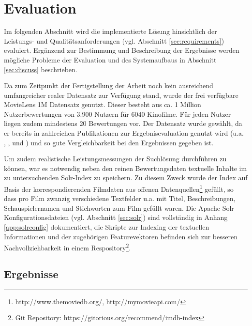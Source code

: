 \newpage \section{Evaluation}\label{sec:evaluation}


Im folgenden Abschnitt wird die implementierte Lösung hinsichtlich der Leistungs- und Qualitätsanforderungen (vgl. Abschnitt \ref{sec:requirements}) evaluiert. Ergänzend zur Bestimmung und Beschreibung der Ergebnisse werden mögliche Probleme der Evaluation und des Systemaufbaus in Abschnitt \ref{sec:discuss} beschrieben.

Da zum Zeitpunkt der Fertigstellung der Arbeit noch kein ausreichend umfangreicher realer Datensatz zur Verfügung stand, wurde der frei verfügbare MovieLens 1M \citep{movielens1m} Datensatz genutzt. Dieser besteht aus ca. 1 Million Nutzerbewertungen von 3.900 Nutzern für 6040 Kinofilme. Für jeden Nutzer liegen zudem mindestens 20 Bewertungen vor. Der Datensatz wurde gewählt, da er bereits in zahlreichen Publikationen zur Ergebnisevaluation genutzt wird  (u.a.  \citep{Cacheda2011}, \citep{Candillier:2008}, \citep{Paterek07} und \citep{Herlocker:1999:AFP:312624.312682}) und so gute Vergleichbarkeit bei den Ergebnissen gegeben ist.

Um zudem realistische Leistungsmessungen der Suchlösung durchführen zu können, war es notwendig neben den reinen Bewertungsdaten textuelle Inhalte im zu untersuchenden Solr-Index zu speichern. Zu diesem Zweck wurde der Index auf Basis der korrespondierenden Filmdaten aus offenen Datenquellen\footnote{http://www.themoviedb.org/, http://mymovieapi.com/} gefüllt, so dass pro Film zwanzig verschiedene Textfelder u.a. mit Titel, Beschreibungen, Schauspielernamen und Stichworten zum Film gefüllt waren. Die Apache Solr Konfigurationsdateien (vgl. Abschnitt \ref{sec:solr}) sind vollständig in Anhang \ref{app:solrconfig} dokumentiert, die Skripte zur Indexing der textuellen Informationen und der zugehörigen Featurevektoren befinden sich zur besseren Nachvollziehbarkeit in einem Respository\footnote{Git Repository: https://gitorious.org/recommend/imdb-index}.

\newpage
\subsection{Ergebnisse}

